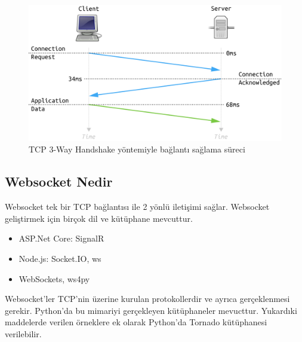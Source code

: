\begin{figure}[h]
    \centering
    \includegraphics[width=\textwidth]{Report/images/tcp.png}
    \caption{TCP 3-Way Handshake yöntemiyle bağlantı sağlama süreci}
    \label{fig:mesh1}
\end{figure}


\subsection{Websocket Nedir}
Websocket tek bir TCP bağlantısı ile 2 yönlü iletişimi sağlar. Websocket geliştirmek için birçok dil ve kütüphane mevcuttur.\cite{websocket1}
\begin{itemize}
  \item ASP.Net Core: SignalR
  \item Node.js: Socket.IO, ws
  \item WebSockets, ws4py
\end{itemize}
Websocket'ler TCP'nin üzerine kurulan protokollerdir ve ayrıca gerçeklenmesi gerekir. Python'da bu mimariyi gerçekleyen kütüphaneler mevucttur. Yukardıki maddelerde verilen örneklere ek olarak Python'da Tornado kütüphanesi verilebilir\cite{websocket2}.

